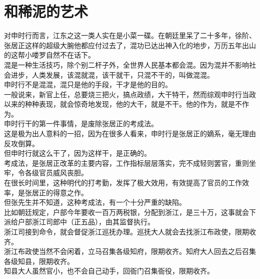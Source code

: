 \section{和稀泥的艺术}
\ifnum{}
	\begin{multicols}{\theparacolNo}
\fi
对申时行而言，江东之这一类人实在是小菜一碟。在朝廷里呆了二十多年，徐阶、张居正这样的超级大腕他都应付过去了，混功已达出神入化的地步，万历五年出山的这帮小喽罗自然不在话下。\\

混是一种生活技巧，除个别二杆子外，全世界人民基本都会混。因为混并不影响社会进步，人类发展，该混就混，该干就干，只混不干的，叫做混混。\\

申时行不是混混，混只是他的手段，干才是他的目的。\\

一般说来，新官上任，总要烧三把火，搞点政绩，大干特干，然而综观申时行当政以来的种种表现，就会惊奇地发现，他的大干，就是不干。他的作为，就是不作为。\\

申时行干的第一件事情，是废除张居正的考成法。\\

这是极为出人意料的一招，因为在很多人看来，申时行是张居正的嫡系，毫无理由反攻倒算。\\

但申时行就这么干了，因为这样干，是正确的。\\

考成法，是张居正改革的主要内容，工作指标层层落实，完不成轻则罢官，重则坐牢，令各级官员威风丧胆。\\

在很长时间里，这种明代的打考勤，发挥了极大效用，有效提高了官员的工作效率，是张居正的得意之作。\\

但张先生并不知道，这种考成法，有一个十分严重的缺陷。\\

比如朝廷规定，户部今年要收一百万两税银，分配到浙江，是三十万，这事就会下派给户部浙江司郎中（正五品），由其监督执行。\\

浙江司接到命令，就会督促浙江巡抚办理。巡抚大人就会去找浙江布政使，限期收齐。\\

浙江布政使当然不会闲着，立马召集各级知府，限期收齐。知府大人回去之后召集各级知县，限期收齐。\\

知县大人虽然官小，也不会自己动手，回衙门召集衙役，限期收齐。\\


\end{multicols}

